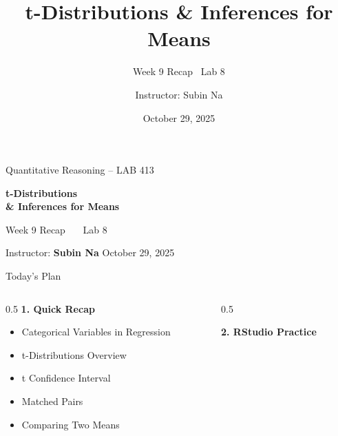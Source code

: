 \documentclass[aspectratio=169,11pt]{beamer}
\title{\bfseries t-Distributions \& Inferences for Means}
\subtitle{Week 9 Recap \textbullet\ Lab 8}
\author{Instructor: Subin Na}
\institute{Quantitative Reasoning -- LAB 413}
\date{October 29, 2025}
\begin{document}
{
\begin{frame}
  \vfill
  {\color{qrgray}\small Quantitative Reasoning -- LAB 413}\\[0.6em]
  {\color{qrnavy}\huge\bfseries t-Distributions\\[0.15em]\& Inferences for Means\par}
  \vspace{0.4em}
  {\color{qrblue}\large Week 9 Recap \ \textbullet\ \ Lab 8}\par
  \vspace{1.6em}
  {\color{qrgray} Instructor: \textbf{Subin Na} \hfill October 29, 2025}
  \vfill
\end{frame}
}

\begin{frame}{Today's Plan}
  \begin{columns}[T]
    \begin{column}{0.5\textwidth}
      \textbf{\color{qrnavy}1. Quick Recap}
      \begin{itemize}
        \item Categorical Variables in Regression
        \item t-Distributions Overview
        \item t Confidence Interval
        \item Matched Pairs
        \item Comparing Two Means
      \end{itemize}
    \end{column}
    \begin{column}{0.5\textwidth}
      \vspace{2.4em}

      \textbf{\color{qrnavy}2. RStudio Practice}
    \end{column}
  \end{columns}
\end{frame}
\end{document}
